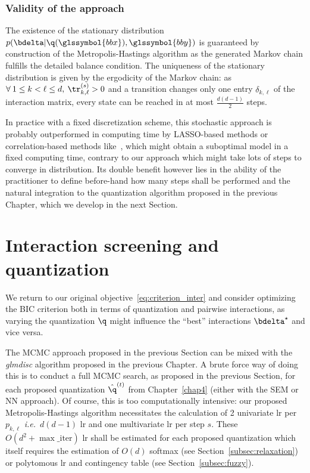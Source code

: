 \subsubsection{Validity of the approach}


The existence of the stationary distribution $p(\bdelta | \q(\glssymbol{bbx}),\glssymbol{bby})$ is guaranteed by construction of the Metropolis-Hastings algorithm as the generated Markov chain fulfills the detailed balance condition. The uniqueness of the stationary distribution is given by the ergodicity of the Markov chain: as $\forall \: 1 \leq  k < \ell \leq d, \: \tr_{k,\ell}^{(s)} > 0$ and a transition changes only one entry $\delta_{k,\ell}$ of the interaction matrix, every state can be reached in at most $\frac{d(d-1)}{2}$ steps.

In practice with a fixed discretization scheme, this stochastic approach is probably outperformed in computing time by LASSO-based methods or correlation-based methods like~\cite{simon}, which might obtain a suboptimal model in a fixed computing time, contrary to our approach which might take lots of steps to converge in distribution. Its double benefit however lies in the ability of the practitioner to define before-hand how many steps shall be performed and the natural integration to the quantization algorithm proposed in the previous Chapter, which we develop in the next Section.

\section{Interaction screening and quantization}

We return to our original objective~\ref{eq:criterion_inter} and consider optimizing the BIC criterion both in terms of quantization and pairwise interactions, as varying the quantization $\q$ might influence the ``best'' interactions $\bdelta^\star$ and vice versa.

The MCMC approach proposed in the previous Section can be mixed with the \textit{glmdisc} algorithm proposed in the previous Chapter. A brute force way of doing this is to conduct a full MCMC search, as proposed in the previous Section, for each proposed quantization $\hat{\q}^{(t)}$ from Chapter~\ref{chap4} (either with the SEM or NN approach). Of course, this is too computationally intensive: our proposed Metropolis-Hastings algorithm necessitates the calculation of 2 univariate \gls{lr} per $p_{k,\ell}$ \textit{i.e.}\ $d(d-1)$ \gls{lr} and one multivariate \gls{lr} per step $s$. These $O(d^2 + \max\_{\text{iter}})$ \gls{lr} shall be estimated for each proposed quantization which itself requires the estimation of $O(d)$ softmax (see Section~\ref{subsec:relaxation}) or polytomous \gls{lr} and contingency table (see Section~\ref{subsec:fuzzy}).


